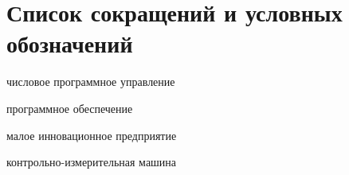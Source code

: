 \chapter*{Список сокращений и условных обозначений} %

\begin{description}[align=right,leftmargin=3.5cm]
\item[ЧПУ] числовое программное управление
\item[ПО] программное обеспечение
\item[МИП] малое инновационное предприятие
\item[КИМ] контрольно-измерительная машина 
\end{description}
